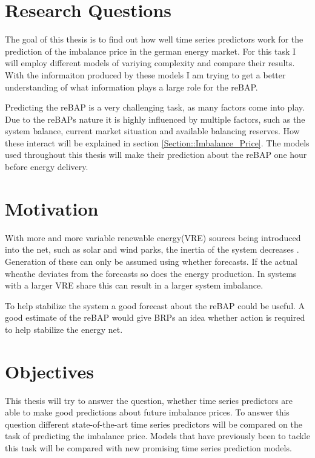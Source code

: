 \documentclass[class=scrbook, crop=false]{standalone}
\begin{document}


\section{Research Questions}
\label{Section::Research_Questions}
The goal of this thesis is to find out how well time series predictors work for the prediction of the imbalance price in the german energy market. 
For this task I will employ different models of variying complexity and compare their results.
With the informaiton produced by these models I am trying to get a better understanding of what information plays a large role for the reBAP.

Predicting the reBAP is a very challenging task, as many factors come into play.
Due to the reBAPs nature it is highly influenced by multiple factors, such as the system balance, current market situation and available balancing reserves. 
How these interact will be explained in section \ref{Section::Imbalance_Price}. 
The models used throughout this thesis will make their prediction about the reBAP one hour before energy delivery. 


\section{Motivation}
\label{Section::Motivation}

With more and more variable renewable energy(VRE) sources being introduced into the net, such as solar and wind parks, the inertia of the system decreases \cite{weitemeyerIntegrationRenewableEnergy2015}. 
Generation of these can only be assumed using whether forecasts. If the actual wheathe deviates from the forecasts so does the energy production. In systems with a larger VRE share this can result in a larger system imbalance. 

To help stabilize the system a good forecast about the reBAP could be useful. A good estimate of the reBAP would give BRPs an idea whether action is required to help stabilize the energy net.

\section{Objectives}
\label{Section::Objectives}
This thesis will try to answer the question, whether time series predictors are able to make good predictions about future imbalance prices. To answer this question different state-of-the-art time series predictors will be compared on the task of predicting the imbalance price. 
Models that have previously been to tackle this task will be compared with new promising time series prediction models.
\end{document}

